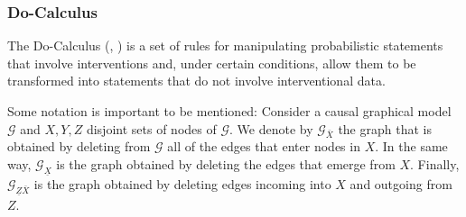 \documentclass[english,letterpaper,12pt,final]{article}
\theoremstyle{definition}
\begin{document}
	\subsubsection{Do-Calculus}
The Do-Calculus (\cite{pearl1995causal}, \cite{pearl2009causality}) is a set of rules for manipulating probabilistic statements that involve interventions and, under certain conditions, allow them to be transformed into statements that do not involve interventional data. 
	
	Some notation is important to be mentioned: Consider a causal graphical model $\mathcal{G}$ and $X,Y,Z$ disjoint sets of nodes of $\mathcal{G}$. We denote by $\mathcal{G}_{\bar{X}}$ the graph that is obtained by deleting from $\mathcal{G}$ all of the edges that enter nodes in $X$. In the same way, $\mathcal{G}_{\underline{X}}$ is the graph obtained by deleting the edges that emerge from $X$. Finally, $\mathcal{G}_{\underline{Z}\bar{X}}$ is the graph obtained by deleting edges incoming into $X$ and outgoing from $Z$.
	
\end{document}
